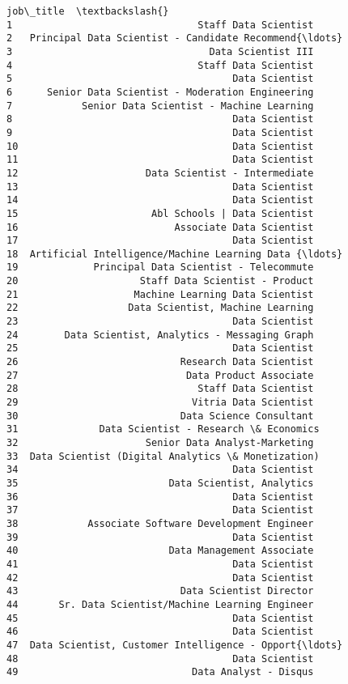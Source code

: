\documentclass[11pt]{article}
\makeatletter
\newcommand{\boxspacing}{\kern\kvtcb@left@rule\kern\kvtcb@boxsep}
\newcommand{\prompt}[4]{
        \ttfamily\llap{{\color{#2}[#3]:\hspace{3pt}#4}}\vspace{-\baselineskip}
    }
\makeatother
\begin{document}
            \begin{tcolorbox}[breakable, size=fbox, boxrule=.5pt, pad at break*=1mm, opacityfill=0]
\prompt{Out}{outcolor}{22}{\boxspacing}
\begin{Verbatim}[commandchars=\\\{\}]
                                            job\_title  \textbackslash{}
1                                Staff Data Scientist
2   Principal Data Scientist - Candidate Recommend{\ldots}
3                                  Data Scientist III
4                                Staff Data Scientist
5                                      Data Scientist
6      Senior Data Scientist - Moderation Engineering
7            Senior Data Scientist - Machine Learning
8                                      Data Scientist
9                                      Data Scientist
10                                     Data Scientist
11                                     Data Scientist
12                      Data Scientist - Intermediate
13                                     Data Scientist
14                                     Data Scientist
15                       Abl Schools | Data Scientist
16                           Associate Data Scientist
17                                     Data Scientist
18  Artificial Intelligence/Machine Learning Data {\ldots}
19             Principal Data Scientist - Telecommute
20                     Staff Data Scientist - Product
21                    Machine Learning Data Scientist
22                   Data Scientist, Machine Learning
23                                     Data Scientist
24        Data Scientist, Analytics - Messaging Graph
25                                     Data Scientist
26                            Research Data Scientist
27                             Data Product Associate
28                               Staff Data Scientist
29                              Vitria Data Scientist
30                            Data Science Consultant
31              Data Scientist - Research \& Economics
32                      Senior Data Analyst-Marketing
33  Data Scientist (Digital Analytics \& Monetization)
34                                     Data Scientist
35                          Data Scientist, Analytics
36                                     Data Scientist
37                                     Data Scientist
38            Associate Software Development Engineer
39                                     Data Scientist
40                          Data Management Associate
41                                     Data Scientist
42                                     Data Scientist
43                            Data Scientist Director
44       Sr. Data Scientist/Machine Learning Engineer
45                                     Data Scientist
46                                     Data Scientist
47  Data Scientist, Customer Intelligence - Opport{\ldots}
48                                     Data Scientist
49                              Data Analyst - Disqus


\end{Verbatim}
\end{tcolorbox}
\end{document}
